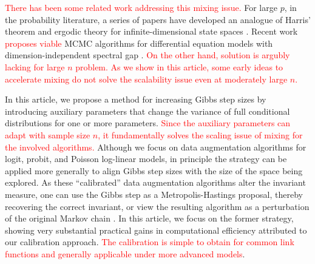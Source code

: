 \documentclass[11pt]{article}
\newcommand{\leo}[1]{{\textcolor{red}{#1}}}
\begin{document}
\leo{
There has been some related work addressing this mixing issue.}
 For large $p$, in the probability literature, a series of papers have developed an analogue of Harris' theorem and ergodic theory for infinite-dimensional state spaces \citep{hairer2011asymptotic}. Recent work \leo{proposes viable}
MCMC algorithms for differential equation models with dimension-independent spectral gap \citep{hairer2014spectral}.
\leo{ On the other hand, solution is argubly lacking for large $n$ problem. 
As we show in this article, some early ideas to accelerate mixing \citep{liu1999parameter,meng1999seeking,papaspiliopoulos2007general} do not solve the scalability issue even at moderately large $n$.} 

In this article, we propose a method for increasing Gibbs step sizes by introducing auxiliary parameters that change the variance of full conditional distributions for one or more parameters. \leo{Since the auxiliary parameters can adapt
with sample size $n$, it fundamentally solves the scaling issue of mixing for the involved algorithms.} Although we focus on data augmentation algorithms for logit, probit, and Poisson log-linear models, in principle the strategy can be applied more generally to align Gibbs step sizes with the size of the space being explored. As these ``calibrated'' data augmentation algorithms alter the invariant measure, one can use the Gibbs step as a Metropolis-Hastings proposal, thereby recovering the correct invariant, or view the resulting algorithm as a perturbation of the original Markov chain \citep{tran2016adaptive}. In this article, we focus on the former strategy, showing very substantial practical gains in computational efficiency attributed to our calibration approach. \leo{The calibration is simple
to obtain for  common link functions and  generally applicable under more advanced models}.
\end{document}
